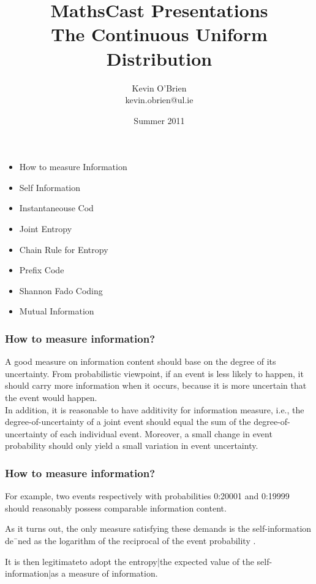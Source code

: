 \documentclass[a4]{beamer}
\title[MathsCast]{MathsCast Presentations \\ {\normalsize The Continuous Uniform Distribution}}
\author[Kevin O'Brien]{Kevin O'Brien \\ {\scriptsize kevin.obrien@ul.ie}}
\date{Summer 2011}
\institute[Maths \& Stats]{Dept. of Mathematics \& Statistics, \\ University \textit{of} Limerick}
\begin{document}
\begin{frame}
\begin{itemize}
	\item How to measure Information
	\item Self Information
	\item Instantaneouse Cod
	\item Joint Entropy
	\item Chain Rule for Entropy
	\item Prefix Code
	\item Shannon Fado Coding
	\item Mutual Information
\end{itemize}
\end{frame}

\begin{frame}
\frametitle{How to measure information?}
A good measure on information content
should base on the degree of its uncertainty.
From probabilistic viewpoint, if an event is less likely to happen, it should
carry more information when it occurs, because it is more uncertain that the
event would happen.\\ \bigskip In addition, it is reasonable to have additivity for information measure, i.e., the degree-of-uncertainty of a joint event should equal the sum
of the degree-of-uncertainty of each individual event. Moreover, a small change
in event probability should only yield a small variation in event uncertainty.
\end{frame}

\begin{frame}
\frametitle{How to measure information?}
For example, two events respectively with probabilities 0:20001 and 0:19999 should
reasonably possess comparable information content. 

As it turns out, the only
measure satisfying these demands is the self-information de¯ned as the logarithm
of the reciprocal of the event probability . 

It is then legitimateto adopt the entropy|the expected value of the self-information|as a measure
of information.




\end{frame}
\end{document}
